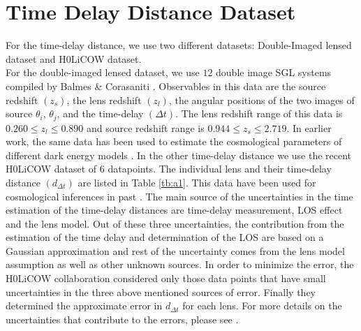 \documentclass[12pt]{report}
\begin{document}
\section{Time Delay Distance Dataset}
For the time-delay distance, we use two different datasets: Double-Imaged lensed dataset and H0LiCOW dataset.\\
For the double-imaged lensed dataset, we use $12$ double image SGL systems compiled by Balmes \& Corasaniti \cite{ib2013}. Observables in this data are the source redshift $(z_s)$, the lens redshift $(z_l)$, the angular positions of the two images of source $\theta_i$, $\theta_j$, and the time-delay $(\Delta t)$.  The lens redshift range of this data is $0.260\leq z_l\leq 0.890$ and source redshift range is $0.944\leq z_s\leq 2.719$. In earlier work, the same data has been used to estimate the cosmological parameters of different dark energy models \cite{ ij2015, cc2015}. In the other time-delay distance we use the recent H0LiCOW dataset of 6 datapoints.  The individual lens and their time-delay distance $(d_{\Delta t})$ are listed in Table \ref{tb:a1}. This data have been used for cosmological inferences in past \cite{kc2019,jj2020}. The main source of the uncertainties in the time estimation of the time-delay distances are time-delay measurement, LOS effect and the lens model. Out of these three uncertainties, the contribution from the estimation of the time delay and determination of the LOS are based on a Gaussian approximation and rest of the uncertainty comes from the lens model assumption as well as other unknown sources. In order to minimize the error, the H0LiCOW collaboration considered only those data points that have small uncertainties in the three above mentioned sources of error. Finally they determined the approximate error in $d_{\Delta t}$ for each lens. For more details on the uncertainties that contribute to the errors, please see \cite{kc2019}. 

\end{document}

